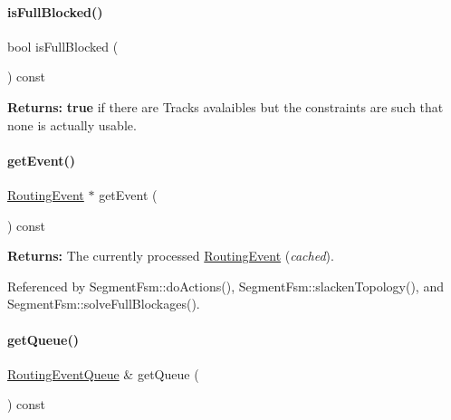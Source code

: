 \paragraph{\texorpdfstring{is\+Full\+Blocked()}{isFullBlocked()}}
{\footnotesize\ttfamily bool is\+Full\+Blocked (\begin{DoxyParamCaption}{ }\end{DoxyParamCaption}) const\hspace{0.3cm}{\ttfamily [inline]}}

{\bfseries Returns\+:} {\bfseries true} if there are Tracks avalaibles but the constraints are such that none is actually usable. \mbox{\label{classKite_1_1SegmentFsm_a513f39c546ef4be0d13787cdace4eadf}} 
\paragraph{\texorpdfstring{get\+Event()}{getEvent()}}
{\footnotesize\ttfamily \mbox{\hyperlink{classKite_1_1RoutingEvent}{Routing\+Event}} $\ast$ get\+Event (\begin{DoxyParamCaption}{ }\end{DoxyParamCaption}) const\hspace{0.3cm}{\ttfamily [inline]}}

{\bfseries Returns\+:} The currently processed \mbox{\hyperlink{classKite_1_1RoutingEvent}{Routing\+Event}} ({\itshape cached}). 

Referenced by Segment\+Fsm\+::do\+Actions(), Segment\+Fsm\+::slacken\+Topology(), and Segment\+Fsm\+::solve\+Full\+Blockages().

\mbox{\label{classKite_1_1SegmentFsm_a3e86badede6ba842280779cecea21e81}} 
\paragraph{\texorpdfstring{get\+Queue()}{getQueue()}}
{\footnotesize\ttfamily \mbox{\hyperlink{classKite_1_1RoutingEventQueue}{Routing\+Event\+Queue}} \& get\+Queue (\begin{DoxyParamCaption}{ }\end{DoxyParamCaption}) const\hspace{0.3cm}{\ttfamily [inline]}}


